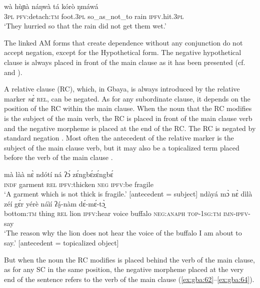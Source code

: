 \documentclass[output=paper,colorlinks=true, citecolor=brown]{langscibook}
\begin{document}
\ea\label{ex:gba:59}
    \gll  wà hùɲà náŋwà tá kórò ŋmáwá \\ 
          \textsc{3pl} \textsc{pfv:}detach:\textsc{tm} foot.\textsc{3pl} so\_as\_not\_to rain \textsc{ipfv}.hit.\textsc{3pl} \\
    \glt ‘They hurried so that the rain did not get them wet.’
\z 

The linked AM forms that create dependence without any conjunction do not accept negation, except for the Hypothetical form. The negative hypothetical clause is always placed in front of the main clause as it has been presented (cf.  and ).

A relative clause (RC), which, in Gbaya, is always introduced by the relative marker \textit{nɛ̀} \textsc{rel,} can be negated. As for any subordinate clause, it depends on the position of the RC within the main clause. When the noun that the RC modifies is the subject of the main verb, the RC is placed in front of the main clause verb and the negative morpheme is placed at the end of the RC. The RC is negated by standard negation . Most often the antecedent of the relative marker is the subject of the main clause verb, but it may also be a topicalized term placed before the verb of the main clause . 

\ea\label{ex:gba:60}
    \gll mà làà nɛ̀ ndótí ná ʔɔ́ zɛ́ngbɛ́zɛ́ngbɛ́ \\ 
         \textsc{indf} garment \textsc{rel} \textsc{ipfv}:thicken \textsc{neg} \textsc{ipfv}:be fragile \\
    \glt ‘A garment which is not thick is fragile.’ [antecedent = subject]
\z 
\ea\label{ex:gba:61}
    \gll ndàyá mɔ̀ nɛ̀ dìlà zéí gɛ́r yérè náìí ʔá̰-nàm dɛ́-mɛ́-tɔ̰̀ \\ 
         bottom:\textsc{tm} thing \textsc{rel} lion \textsc{ipfv}:hear voice buffalo \textsc{neg:anaph} \textsc{top-1sg:tm} \textsc{imn-ipfv}-say \\
    \glt ‘The reason why the lion does not hear the voice of the buffalo I am about to say.’ [antecedent = topicalized object]
\z 

But when the noun the RC modifies is placed behind the verb of the main clause, as for any SC in the same position, the negative morpheme placed at the very end of the sentence refers to the verb of the main clause (\ref{ex:gba:62}--\ref{ex:gba:64}). 
\end{document}
